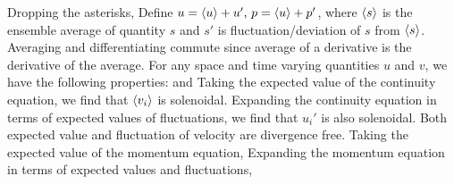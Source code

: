 \noindent Dropping the asterisks,
Define $u=\expval{u}+u',\,p=\expval{u} +p'$, where $\expval{s}$ is the ensemble average of quantity $s$ and $s'$ is fluctuation/deviation of $s$ from $\expval{s}$. Averaging and differentiating commute since average of a derivative is the derivative of the average. For any space and time varying quantities $u$ and $v$, we have the following properties:
and
Taking the expected value of the continuity equation, we find that $\expval{v_i}$ is solenoidal.
Expanding the continuity equation in terms of expected values of fluctuations, we find that $u_i'$ is also solenoidal.
Both expected value and fluctuation of velocity are divergence free. Taking the expected value of the momentum equation,
Expanding the momentum equation in terms of expected values and fluctuations,

